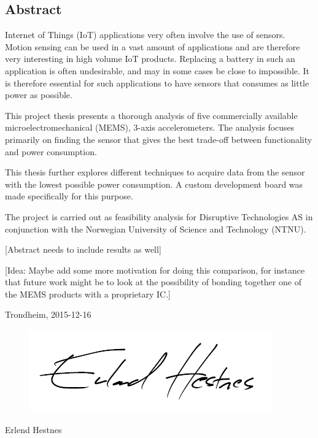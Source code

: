 \begin{center}
\section*{Abstract}
\end{center}

Internet of Things (IoT) applications very often involve the use of sensors. Motion sensing can be used in a vast amount of applications and are therefore very interesting in high volume IoT products. Replacing a battery in such an application is often undesirable, and may in some cases be close to impossible. It is therefore essential for such applications to have sensors that consumes as little power as possible. 

This project thesis presents a thorough analysis of five commercially available microelectromechanical (MEMS), 3-axis accelerometers. The analysis focuses primarily on finding the sensor that gives the best trade-off between functionality and power consumption. 

This thesis further explores different techniques to acquire data from the sensor with the lowest possible power consumption. A custom development board was made specifically for this purpose.

The project is carried out as feasibility analysis for Disruptive Technologies AS in conjunction with the Norwegian University of Science and Technology (NTNU).

[Abstract needs to include results as well]

[Idea: Maybe add some more motivation for doing this comparison, for instance that future work might be to look at the possibility of bonding together one of the MEMS products with a proprietary IC.]


\begin{center}
Trondheim, 2015-12-16\\[1pc]
\begin{figure}[h]
\centering
\includegraphics[scale=0.5]{fig/underskrift.png}
\label{fig:underskrift}
\end{figure}
Erlend Hestnes
\end{center}
